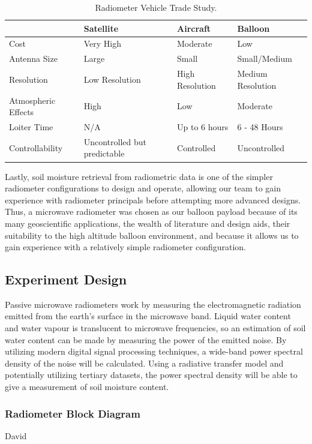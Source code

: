 \documentclass[12pt]{article}
\begin{document}
\begin{table}[!h]
	\centering
	\vspace{0.5cm}
	\renewcommand{\arraystretch}{1.3}
	\caption{Radiometer Vehicle Trade Study. }
	\label{tab:vehicle_trade}
	\begin{tabularx}{\textwidth}{llll}
		\toprule
						& Satellite & Aircraft & Balloon \\		
		\midrule
		Cost					&Very High&Moderate&Low \\ 
		Antenna Size 			&Large&Small&Small/Medium \\
		Resolution 				&Low Resolution&High Resolution&Medium Resolution \\ 
		Atmospheric Effects		&High&Low&Moderate \\ 
		Loiter Time				&N/A&Up to 6 hours&6 - 48 Hours \\ 
		Controllability			&Uncontrolled but predictable&Controlled&Uncontrolled 
	\end{tabularx}
\end{table}

Lastly, soil moisture retrieval from radiometric data is one of the simpler radiometer configurations to design and operate, allowing our team to gain experience with radiometer principals before attempting more advanced designs. Thus, a microwave radiometer was chosen as our balloon payload because of its many geoscientific applications, the wealth of literature and design aids, their suitability to the high altitude balloon environment, and because it allows us to gain experience with a relatively simple radiometer configuration.
 
\subsection{Experiment Design}

Passive microwave radiometers work by measuring the electromagnetic radiation emitted from the earth's surface in the microwave band. Liquid water content and water vapour is translucent to microwave frequencies, so an estimation of soil water content can be made by measuring the power of the emitted noise. By utilizing modern digital signal processing techniques, a wide-band power spectral density of the noise will be calculated. Using a radiative transfer model and potentially utilizing tertiary datasets, the power spectral density will be able to give a measurement of soil moisture content.

\subsubsection{Radiometer Block Diagram}
David
\end{document}
